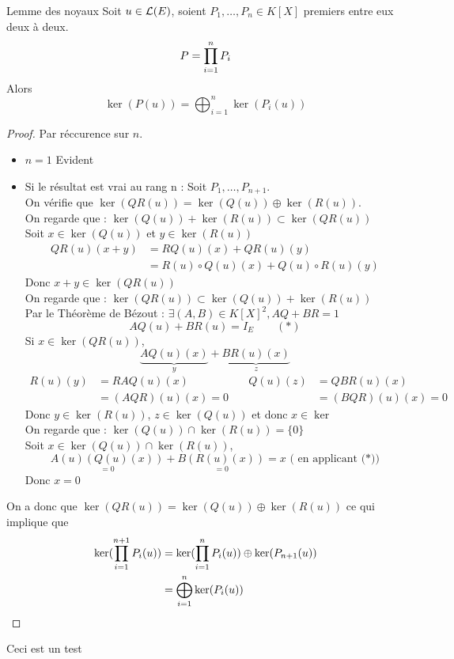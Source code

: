 \documentclass[]{report}
\begin{document}
    \begin{lm}{Lemme des noyaux}{}
        Soit $u\in\mathcal{L}(E)$, soient $P_1,\ldots,P_n\in K[X]$ premiers entre eux deux à deux.
        \[P=\prod_{i=1}^{n}P_i\]
        Alors
        \[\ker(P(u))=\bigoplus_{i=1}^n\ker(P_i(u))\]
    \end{lm}

    \begin{proof}
        Par réccurence sur $n$.
        \begin{itemize}
            \item $n=1$ Evident
            \item Si le résultat est vrai au rang n : Soit $P_1,\ldots,P_{n+1}$.\\
            On vérifie que $\ker(QR(u))=\ker(Q(u))\oplus \ker (R(u))$. \\
            On regarde que : $\ker(Q(u)) + \ker (R(u))\subset\ker(QR(u))$\\
            Soit $x\in\ker (Q(u))$ et $y\in\ker (R(u))$
            \begin{align*} QR(u)(x+y)&=RQ(u)(x)+QR(u)(y)\\
            &= R(u)\circ Q(u)(x)+Q(u)\circ R(u)(y)\end{align*}
            Donc $x+y\in \ker (QR(u))$\\
            On regarde que : $\ker(QR(u))\subset\ker(Q(u)) + \ker (R(u))$\\
            Par le Théorème de Bézout : $\exists (A,B)\in K[X]^2,AQ+BR=1$
            \[AQ(u)+BR(u)=I_E\qquad (*)\]
            Si $x\in\ker (QR(u))$,
            \[\underset{y}{\underbrace{AQ(u)(x)}}+\underset{z}{\underbrace{BR(u)(x)}}\]
            \begin{align*}
                R(u)(y)&=RAQ(u)(x)\quad&\quad Q(u)(z)&=QBR(u)(x)\\
                &=(AQR)(u)(x)=0&&=(BQR)(u)(x)=0
            \end{align*}
            Donc $y\in\ker (R(u))$, $z\in\ker (Q(u))$ et donc $x\in\ker$\\
            On regarde que : $\ker (Q(u))\cap\ker (R(u))=\{0\}$\\
            Soit $x\in \ker (Q(u))\cap\ker(R(u))$,
            \[\underset{=0}{A(u)(Q(u)(x))}+\underset{=0}{B(R(u)(x))}=x \text{ ( en applicant (*))}\]
            Donc $x=0$
        \end{itemize}
        On a donc que $\ker (QR(u))=\ker(Q(u))\oplus\ker (R(u))$ ce qui implique que
        \begin{align*}
            \ker (\prod_{i=1}^{n+1}P_i(u))&=\ker(\prod_{i=1}^{n}P_i(u))\oplus\ker(P_{n+1}(u))\\
            &=\bigoplus_{i=1}^n\ker(P_i(u))
        \end{align*}
    \end{proof}
    
    Ceci est un test
\end{document}
